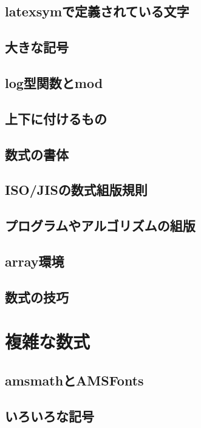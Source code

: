 \documentclass{jsbook}
\begin{document}
\section{latexsymで定義されている文字}

\section{大きな記号}

\section{log型関数とmod}

\section{上下に付けるもの}

\section{数式の書体}

\section{ISO/JISの数式組版規則}

\section{プログラムやアルゴリズムの組版}

\section{array環境}

\section{数式の技巧}

\chapter{複雑な数式}

\section{amsmathとAMSFonts}

\section{いろいろな記号}
\end{document}

